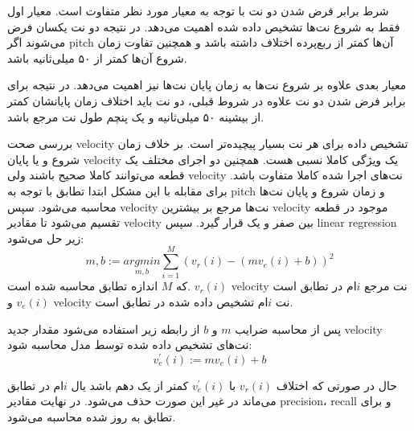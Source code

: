 شرط برابر فرض شدن دو نت با توجه به معیار مورد نظر متفاوت است. معیار اول فقط به
شروع نت‌ها تشخیص داده شده اهمیت می‌دهد. در نتیجه دو نت یکسان فرض می‌شوند اگر
\gls{pitch} آن‌ها کمتر از ربع‌پرده اختلاف داشته باشد و همچنین تفاوت زمان شروع
آن‌ها کمتر از ۵۰ میلی‌ثانیه باشد.

معیار بعدی علاوه بر شروع نت‌ها به زمان پایان نت‌ها نیز اهمیت می‌دهد. در نتیجه
برای برابر فرض شدن دو نت علاوه در شروط قبلی، دو نت باید اختلاف زمان پایانشان
کمتر از بیشینه ۵۰ میلی‌ثانیه و یک پنچم طول نت مرجع باشد.

بررسی صحت \gls{velocity} تشخیص داده برای هر نت بسیار پیچیده‌تر است. بر خلاف زمان
شروع و یا پایان \gls{velocity} یک ویژگی کاملا نسبی هست. همچنین دو اجرای مختلف یک
قطعه می‌توانند کاملا صحیح باشند ولی \gls{velocity} نت‌های اجرا شده کاملا متفاوت
باشد. برای مقابله با این مشکل ابتدا تطابق با توجه به \gls{pitch} و زمان شروع و
پایان نت‌ها محاسبه می‌شود. سپس \gls{velocity} نت‌ها مرجع بر بیشترین
\gls{velocity} موجود در قطعه تقسیم می‌شود تا مقادیر \gls{velocity} بین صفر و یک
قرار گیرد. سپس \gls{linear regression} زیر حل می‌شود:
\begin{equation}
    m, b := \underset{m, b}{argmin} \sum_{i=1}^{M} (v_r(i) - (mv_e(i) + b))^2
\end{equation}
که $M$ اندازه تطابق محاسبه شده است. $v_r(i)$ \gls{velocity} نت مرجع $i$ام در
تطابق است و $v_e(i)$ \gls{velocity} نت $i$ام تشخیص داده شده در تطابق است.

پس از محاسبه ضرایب $m$ و $b$ از رابطه زیر استفاده می‌شود مقدار جدید
\gls{velocity} نت‌های تشخیص داده شده توسط مدل محاسبه شود:
\begin{equation}
    v_e^\prime (i) := mv_e(i) + b
\end{equation}

حال در صورتی که اختلاف $v_r(i)$ با $v_e^\prime(i)$ کمتر از یک دهم باشد یال $i$ام
در تطابق می‌ماند در غیر این صورت حذف می‌شود. در نهایت مقادیر \gls{precision}،‌
\gls{recall} و  برای تطابق به روز شده محاسبه می‌شود.